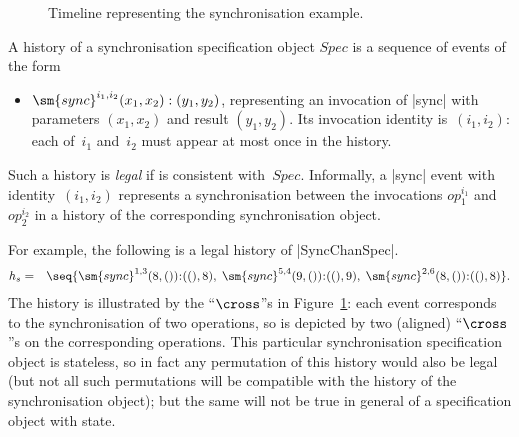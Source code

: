 
\begin{figure}
\unScalaMid
\def\X{node {$\cross$}}
\begin{center}
\end{center}
\caption{Timeline representing the synchronisation example.}
\label{fig:sync-timeline}
\scalaMid
\end{figure}


A history of a synchronisation specification object $Spec$ is a sequence of
events of the form
\begin{itemize}
\item $\sm{sync}^{i_1, i_2}(x_1, x_2): (y_1, y_2)$, representing an invocation
  of |sync| with parameters $(x_1, x_2)$ and result $(y_1,y_2)$.  Its
  invocation identity is~$(i_1,i_2)$: each of~$i_1$ and~$i_2$ must appear at
  most once in the history.
\end{itemize}
%
Such a history is \emph{legal} if is consistent with~$Spec$.  Informally, a
|sync| event with identity~$(i_1,i_2)$ represents a synchronisation between
the invocations $op_1^{i_1}$ and $op_2^{i_2}$ in a history of the
corresponding synchronisation object.

For example, the following is a legal history of |SyncChanSpec|.
\begin{eqnarray*}
h_s & = & 
\seq{
 \sm{sync}^{1,3}(8,()) \:: ((), 8), \;
 \sm{sync}^{5,4}(9,()) \:: ((), 9), \;
 \sm{sync}^{2,6}(8,()) \:: ((), 8) } .
\end{eqnarray*}
The history is illustrated by the ``$\cross$''s in
Figure~\ref{fig:sync-timeline}: each event corresponds to the synchronisation
of two operations, so is depicted by two (aligned) ``$\cross$''s on the
corresponding operations.  This particular synchronisation specification
object is stateless, so in fact any permutation of this history would also be
legal (but not all such permutations will be compatible with the history of
the synchronisation object); but the same will not be true in general of a
specification object with state.

